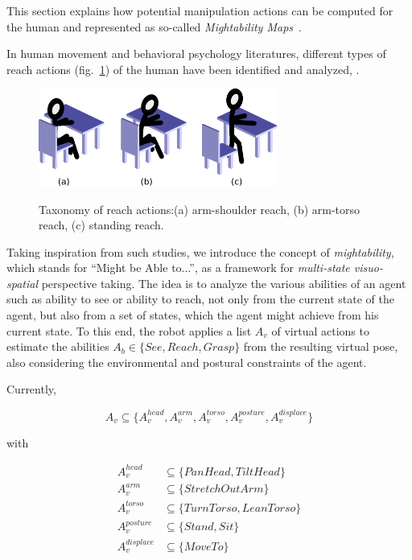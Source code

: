\documentclass{svmult}
\begin{document}
This section explains how potential manipulation actions can be computed for
the human and represented as so-called \emph{Mightability Maps}~\cite{Pandey2010}.

In human movement and behavioral psychology literatures, different types of
reach actions (fig.~\ref{fig|reaches_taxonomy}) of the human have been
identified and analyzed, \cite{Gardner2001, Choi2004}.

\begin{figure}
  \centering
  \includegraphics[width=0.7\textwidth]{./figs/reach_postures.pdf} \\
  \caption {Taxonomy of reach actions:(a) arm-shoulder reach, (b) arm-torso 
  reach, (c) standing reach.}
  \label{fig|reaches_taxonomy}
\end{figure}

Taking inspiration from such studies, we introduce the concept of
\emph{mightability}, which stands for ``Might be Able to...'', as a framework
for \emph{multi-state visuo-spatial} perspective taking. The idea is to analyze
the various abilities of an agent such as ability to see or ability to
reach, not only from the current state of the agent, but also from a set of
states, which the agent might achieve from his current state. To this end,
the robot applies a list $A_v$ of virtual actions to estimate the abilities
$A_b \in \{See, Reach, Grasp\}$ from the resulting virtual pose, also
considering the environmental and postural constraints of the agent.

Currently,

\[ 
A_v \subseteq \{A_v^{head}, A_v^{arm}, A_v^{torso}, A_v^{posture}, A_v^{displace}\}
\]

with

\begin{align*}
A_v^{head} & \subseteq \{PanHead, TiltHead\} \\
A_v^{arm} & \subseteq \{StretchOutArm\} \\
A_v^{torso} & \subseteq \{TurnTorso, LeanTorso\} \\
A_v^{posture} & \subseteq \{Stand, Sit\} \\
A_v^{displace} & \subseteq \{MoveTo\} \\
\end{align*}
\end{document}
